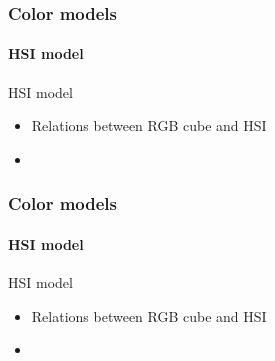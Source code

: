 \documentclass{beamer}
\begin{document}
\begin{frame}
\frametitle{Color models}
\framesubtitle{HSI model}
\begin{block}{HSI model}
\scriptsize{
\begin{itemize}
\item Relations between RGB cube and HSI 
\item[]
\end{itemize}}
\end{block}
\end{frame}
\begin{frame}
\frametitle{Color models}
\framesubtitle{HSI model}
\begin{block}{HSI model}
\scriptsize{
\begin{itemize}
\item Relations between RGB cube and HSI 
\item[]
\end{itemize}}
\end{block}
\end{frame}
\end{document}
